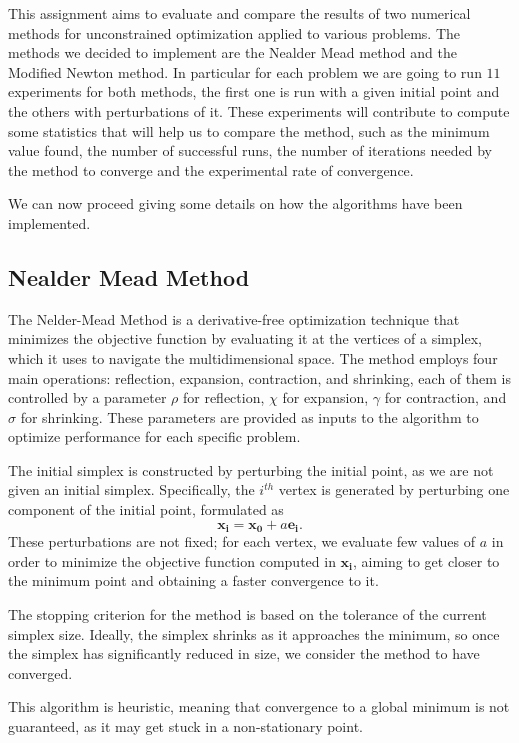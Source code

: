This assignment aims to evaluate and compare the results of two numerical methods for unconstrained optimization applied to various problems.
The methods we decided to implement are the Nealder Mead method and the Modified Newton method. In particular for each problem we are going to run $11$ experiments for both methods, the first one is run with a given initial point and the others with perturbations of it. These experiments will contribute to compute some statistics that will help us to compare the method, such as the minimum value found, the number of successful runs, the number of iterations needed by the method to converge and the experimental rate of convergence.

We can now proceed giving some details on how the algorithms have been implemented.

\subsection*{Nealder Mead Method}
The Nelder-Mead Method is a derivative-free optimization technique that minimizes the objective function by evaluating it at the vertices of a simplex, which it uses to navigate the multidimensional space.
The method employs four main operations: reflection, expansion, contraction, and shrinking, each of them is controlled by a parameter $\rho$ for reflection, $\chi$ for expansion, $\gamma$ for contraction, and $\sigma$ for shrinking. These parameters are provided as inputs to the algorithm to optimize performance for each specific problem.

The initial simplex is constructed by perturbing the initial point, as we are not given an initial simplex. Specifically, the $i^{th}$ vertex is generated by perturbing one component of the initial point, formulated as 
$$\boldsymbol{x_{i}} = \boldsymbol{x_0} + a \boldsymbol{e_i}.$$ These perturbations are not fixed; for each vertex, we evaluate few values of $a$ in order to minimize the objective function computed in $\boldsymbol{x_i}$, aiming to get closer to the minimum point and obtaining a faster convergence to it.

The stopping criterion for the method is based on the tolerance of the current simplex size. Ideally, the simplex shrinks as it approaches the minimum, so once the simplex has significantly reduced in size, we consider the method to have converged.

This algorithm is heuristic, meaning that convergence to a global minimum is not guaranteed, as it may get stuck in a non-stationary point.


